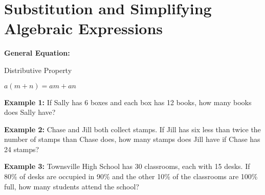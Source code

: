 \section{Substitution and Simplifying Algebraic Expressions}

\textbf{General Equation:}

\begin{center}
Distributive Property

$a(m+n)=am+an$
\end{center}

\vfill
\textbf{Example 1:} If Sally has 6 boxes and each box has 12 books, how many books does Sally have?

\vfill
\textbf{Example 2:} Chase and Jill both collect stamps. If Jill has six less than twice the number of stamps than Chase does, how many stamps does Jill have if Chase has 24 stamps?

\vfill
\textbf{Example 3:} Townsville High School has 30 classrooms, each with 15 desks. If 80\% of desks are occupied in 90\% and the other 10\% of the classrooms are 100\% full, how many students attend the school?

